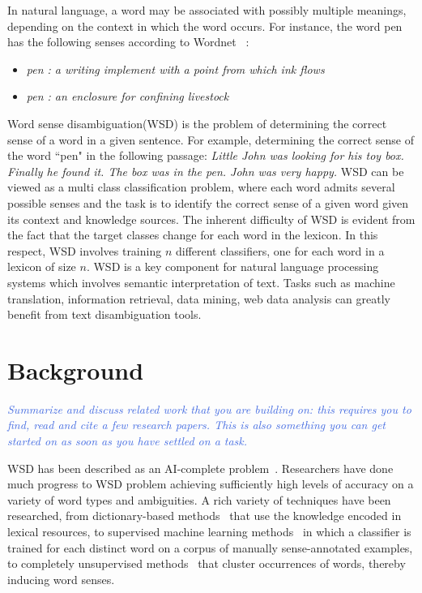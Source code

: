 \documentclass[11pt,letterpaper]{article}
\newcommand{\blue}[1]{\textcolor{RoyalBlue}{#1}}
\newcommand{\instructions}[1]{\blue{\textit{#1}}}
\begin{document}
In natural language, a word may be associated with possibly multiple meanings, depending on the context in which the word occurs. For instance, the word pen has the following senses according to Wordnet ~\cite{wordnet}:
\begin{itemize}
\item \emph{pen : a writing implement with a point from which ink flows}
\item \emph{pen : an enclosure for confining livestock}
\end{itemize}
Word sense disambiguation(WSD) is the problem of determining the correct sense of a word in a given sentence. For example, determining the correct sense of the word ``pen" in the following passage:
\emph{Little John was looking for his toy box. Finally he found it. The box was in the pen. John was very happy.}
WSD can be viewed as a multi class classification problem, where each word admits several possible senses and the task is to identify the correct sense of a given word given its context and knowledge sources. The inherent difficulty of WSD is evident from the fact that the target classes change for each word in the lexicon. In this respect, WSD involves training $n$ different classifiers, one for each word in a lexicon of size $n$. 
WSD is a key component for natural language processing systems which involves semantic interpretation of text. Tasks such as machine translation, information retrieval, data mining, web data analysis can greatly benefit from text disambiguation tools. 


\section{Background}
\label{sec:background}
\instructions{Summarize and discuss related work that you are building on: this requires you to find, read and cite a few research papers. This is also something you can get started on as soon as you have settled on a task.} 

WSD has been described as an AI-complete problem~\cite{mallery1988thinking}. Researchers have done much progress to WSD problem achieving sufficiently high levels of accuracy on a variety of word types and ambiguities. A rich variety of techniques have been researched, from dictionary-based methods~\cite{mihalcea2007using} that use the knowledge encoded in lexical resources, to supervised machine learning methods~\cite{manning1999foundations} in which a classifier is trained for each distinct word on a corpus of manually sense-annotated examples, to completely unsupervised methods~\cite{yarowsky1995unsupervised} that cluster occurrences of words, thereby inducing word senses.
\end{document}
